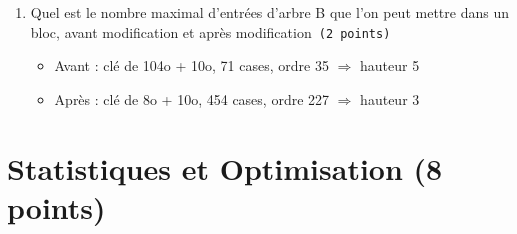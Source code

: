 \begin{enumerate}
  \item Quel est le nombre maximal d'entrées d'arbre B que l'on peut mettre dans un bloc,
     avant modification et après modification~{\tt (2~points)}
\begin{solution}
\begin{itemize}
  \item Avant : clé de 104o + 10o, 71 cases, ordre 35 $\Rightarrow$ hauteur 5
  \item Après : clé de 8o + 10o, 454 cases, ordre 227 $\Rightarrow$ hauteur 3
\end{itemize}
\end{solution}
\end{enumerate}

\section{Statistiques et Optimisation (8 points)}

